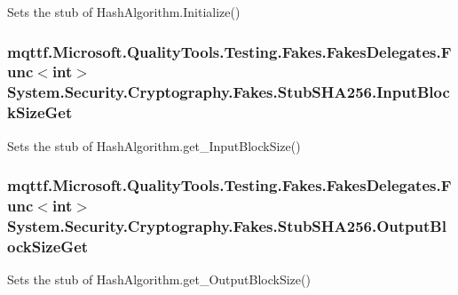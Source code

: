 Sets the stub of Hash\-Algorithm.\-Initialize()

\hypertarget{class_system_1_1_security_1_1_cryptography_1_1_fakes_1_1_stub_s_h_a256_a415c39bcf1074e0f902ba76dfb0a6b98}{
\subsubsection[{Input\-Block\-Size\-Get}]{\setlength{\rightskip}{0pt plus 5cm}mqttf.\-Microsoft.\-Quality\-Tools.\-Testing.\-Fakes.\-Fakes\-Delegates.\-Func$<$int$>$ System.\-Security.\-Cryptography.\-Fakes.\-Stub\-S\-H\-A256.\-Input\-Block\-Size\-Get}}\label{class_system_1_1_security_1_1_cryptography_1_1_fakes_1_1_stub_s_h_a256_a415c39bcf1074e0f902ba76dfb0a6b98}


Sets the stub of Hash\-Algorithm.\-get\-\_\-\-Input\-Block\-Size()

\hypertarget{class_system_1_1_security_1_1_cryptography_1_1_fakes_1_1_stub_s_h_a256_a3456ad16fd841e16d42ca4d0b189dd09}{
\subsubsection[{Output\-Block\-Size\-Get}]{\setlength{\rightskip}{0pt plus 5cm}mqttf.\-Microsoft.\-Quality\-Tools.\-Testing.\-Fakes.\-Fakes\-Delegates.\-Func$<$int$>$ System.\-Security.\-Cryptography.\-Fakes.\-Stub\-S\-H\-A256.\-Output\-Block\-Size\-Get}}\label{class_system_1_1_security_1_1_cryptography_1_1_fakes_1_1_stub_s_h_a256_a3456ad16fd841e16d42ca4d0b189dd09}


Sets the stub of Hash\-Algorithm.\-get\-\_\-\-Output\-Block\-Size()



